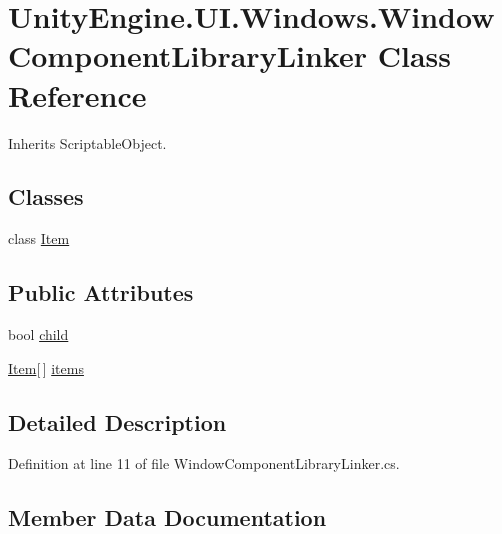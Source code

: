 \hypertarget{class_unity_engine_1_1_u_i_1_1_windows_1_1_window_component_library_linker}{}\section{Unity\+Engine.\+U\+I.\+Windows.\+Window\+Component\+Library\+Linker Class Reference}
\label{class_unity_engine_1_1_u_i_1_1_windows_1_1_window_component_library_linker}


Inherits Scriptable\+Object.

\subsection*{Classes}
\begin{DoxyCompactItemize}
\item 
class \hyperlink{class_unity_engine_1_1_u_i_1_1_windows_1_1_window_component_library_linker_1_1_item}{Item}
\end{DoxyCompactItemize}
\subsection*{Public Attributes}
\begin{DoxyCompactItemize}
\item 
bool \hyperlink{class_unity_engine_1_1_u_i_1_1_windows_1_1_window_component_library_linker_a95f95fd76409ae74d67331a6a7848d7d}{child}
\item 
\hyperlink{class_unity_engine_1_1_u_i_1_1_windows_1_1_window_component_library_linker_1_1_item}{Item}\mbox{[}$\,$\mbox{]} \hyperlink{class_unity_engine_1_1_u_i_1_1_windows_1_1_window_component_library_linker_a3b61b1349902353bf84556af25ba25cc}{items}
\end{DoxyCompactItemize}


\subsection{Detailed Description}


Definition at line 11 of file Window\+Component\+Library\+Linker.\+cs.



\subsection{Member Data Documentation}
\hypertarget{class_unity_engine_1_1_u_i_1_1_windows_1_1_window_component_library_linker_a95f95fd76409ae74d67331a6a7848d7d}{}
